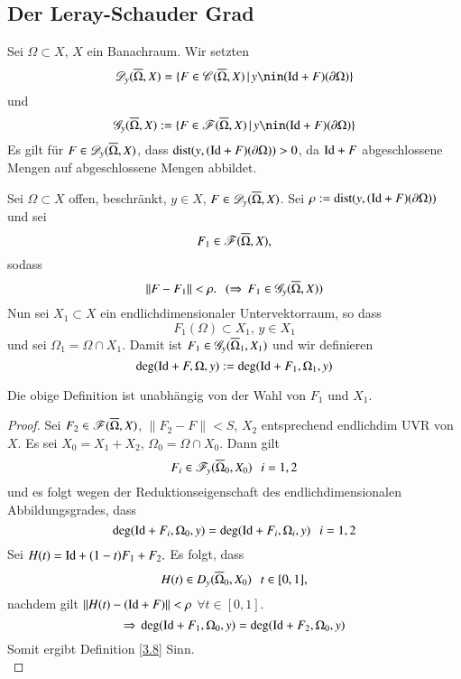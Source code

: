 \subsection{Der Leray-Schauder Grad}

Sei $\Omega\subset X$, $X$ ein Banachraum. Wir setzten
\[
    \ms D_y(\ol \Omega,X)=\{ F\in \ms C(\ol\Omega,X)\, | \, y\nin(\Id + F)(\partial \Omega) \}
\]
und
\[
    \ms G_y(\ol\Omega,X):=\{F\in \ms F(\ol \Omega,X)\, |\, y\nin(\Id+F)(\partial\Omega)\}
\]
Es gilt für $F\in \mathscr D_y(\overline \Omega,X)$, dass $\mathrm{dist}(y,(\mathrm{Id}+F)(\partial\Omega))>0$, da $\mathrm{Id}+F$
abgeschlossene Mengen auf abgeschlossene Mengen abbildet.

\begin{defi}{\label{3.8}}
    Sei $\Omega\subset X$ offen, beschränkt, $y\in X$, $F\in \mathscr D_y(\overline \Omega,X)$. Sei $\rho:=
    \mathrm{dist}(y,(\mathrm{Id}+F)(\partial \Omega))$ und sei
    \[
        F_1\in \mathscr F(\overline \Omega, X),
    \]
    sodass
    \[
        \|F-F_1\|<\rho. \hspace{.25cm} (\Rightarrow \, F_1\in \mathscr G_y(\overline \Omega,X))
    \]
    Nun sei $X_1\subset X$ ein endlichdimensionaler Untervektorraum, so dass
    \[
        F_1(\Omega)\subset X_1,\, y\in X_1
    \] 
    und sei $\Omega_1=\Omega\cap X_1$. Damit ist $F_1\in \mathscr G_y(\overline\Omega_1,X_1)$ und wir definieren
    \[
        \deg(\mathrm{Id}+F,\Omega,y):=\deg(\mathrm{Id}+F_1,\Omega_1,y)
    \]
\end{defi}

\begin{prop}\label{3.9}
    Die obige Definition ist unabhängig von der Wahl von $F_1$ und $X_1$.
\end{prop}

\begin{proof}
    Sei $F_2\in \mathscr F (\overline \Omega,X)$, $\|F_2-F\|<S$, $X_2$ entsprechend endlichdim UVR von $X$. Es sei
    $X_0=X_1+X_2$, $\Omega_0=\Omega\cap X_0$. Dann gilt
    \[
        F_i\in \mathscr F_y(\overline\Omega_0,X_0) \hspace{.25cm} i=1,2
    \]
    und es folgt wegen der Reduktionseigenschaft des endlichdimensionalen Abbildungsgrades, dass
    \[
        \deg(\mathrm{Id} + F_i,\Omega_0,y)=\deg(\mathrm{Id}+F_i,\Omega_i,y)\hspace{.25cm} i=1,2
    \]
    Sei $H(t)=\mathrm{Id} + (1-t)F_1+F_2.$ Es folgt, dass
    \[
        H(t)\in D_y(\overline\Omega_0,X_0) \hspace{.25cm} t\in [0,1],
    \]
    nachdem gilt $\|H(t)-(\mathrm{Id}+F)\|<\rho$ $\forall t\in [0,1]$.
    \[
        \Rightarrow \, \deg(\mathrm{Id}+F_1,\Omega_0,y)=\deg(\mathrm{Id}+F_2,\Omega_0,y)
    \]
    Somit ergibt Definition \ref{3.8} Sinn.
    \[ \]
\end{proof}

